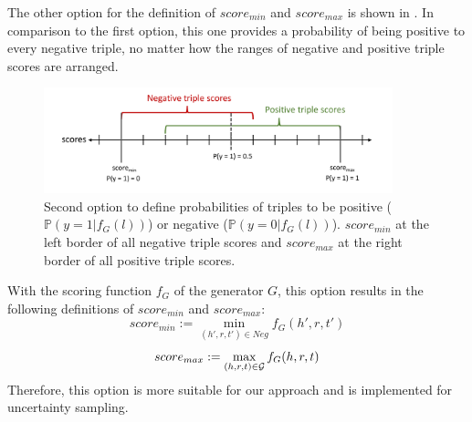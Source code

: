The other option for the definition of $score_{min}$ and $score_{max}$ is shown in .
In comparison to the first option, this one provides a probability of being positive to every negative triple, no matter how the ranges of negative and positive triple scores are arranged.
\begin{figure}[H]
  \centering
    \includegraphics[width=0.9\textwidth]{figures/positives_negatives2.pdf}
  \caption{Second option to define probabilities of triples to be positive ($\mathds{P}(y = 1 | f_G(l))$) or negative ($\mathds{P}(y = 0 | f_G(l))$). 
  $score_{min}$ at the left border of all negative triple scores and $score_{max}$ at the right border of all positive triple scores.}
  \label{fig:positives_negatives2}
\end{figure}
With the scoring function $f_G$ of the generator $G$, this option results in the following definitions of $score_{min}$ and $score_{max}$:
\begin{equation} \label{eqn:opt1_score_min}
    score_{min} := \min_{(h',r,t') \in Neg}{f_G(h',r,t')}
\end{equation}
\begin{equation} \label{eqn:opt1_score_max}
    score_{max} := \max_{(h,r,t) \in \mathcal{G}}{f_G(h,r,t)}
\end{equation}
\clearpage
Therefore, this option is more suitable for our approach and is implemented for uncertainty sampling.

